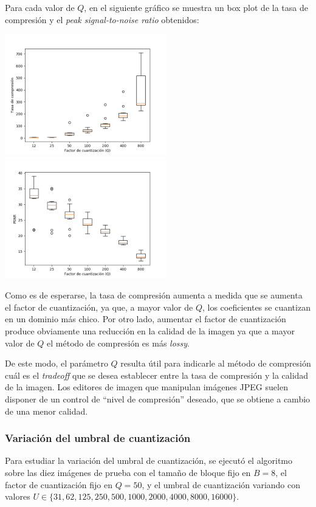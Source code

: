 \documentclass{article}
\newcommand{\set}[1]{\{#1\}}
\begin{document}
Para cada valor de $Q$, en el siguiente gráfico se muestra un
box plot de la tasa de compresión y el
{\em peak signal-to-noise ratio} obtenidos:\\
\begin{center}
\includegraphics[width=7cm]{../imgs/output/gray_plots/q_rate.png}
\includegraphics[width=7cm]{../imgs/output/gray_plots/q_psnr.png}
\end{center}

Como es de esperarse, la tasa de compresión aumenta a medida que
se aumenta el factor de cuantización, ya que, a mayor valor de $Q$,
los coeficientes se cuantizan en un dominio más chico.
Por otro lado, aumentar el factor de cuantización produce obviamente
una reducción en la calidad de la imagen ya que a mayor valor de $Q$
el método de compresión es más {\em lossy}.

De este modo, el parámetro $Q$ resulta útil para indicarle al método
de compresión cuál es el {\em tradeoff} que se desea establecer entre
la tasa de compresión y la calidad de la imagen.
Los editores de imagen que manipulan imágenes JPEG suelen
disponer de un control de ``nivel de compresión'' deseado, que
se obtiene a cambio de una menor calidad.

\subsubsection{Variación del umbral de cuantización}

Para estudiar la variación del umbral de cuantización, se ejecutó el
algoritmo sobre las diez imágenes de prueba con el
tamaño de bloque fijo en $B = 8$,
el factor de cuantización fijo en $Q = 50$,
y el umbral de cuantización variando con valores
$U \in \set{31, 62, 125, 250, 500, 1000, 2000, 4000, 8000, 16000}$.
\end{document}
